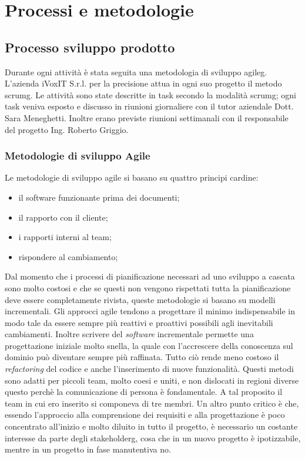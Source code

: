 
\chapter{Processi e metodologie}
\label{cap:processi-metodologie}


\section{Processo sviluppo prodotto}
Durante ogni attività è stata seguita una metodologia di sviluppo \gls{agileg}. L'azienda iVoxIT S.r.l. per la precisione attua in ogni suo progetto il metodo \gls{scrumg}. Le attività sono state descritte in task secondo la modalità \gls{scrumg}; ogni task veniva esposto e discusso in riunioni giornaliere con il tutor aziendale Dott. Sara Meneghetti. Inoltre erano previste riunioni settimanali con il responsabile del progetto Ing. Roberto Griggio.

\subsection{Metodologie di sviluppo Agile}
Le metodologie di sviluppo agile si basano su quattro principi cardine:
\begin{itemize}
    \item il software funzionante prima dei documenti;
    \item il rapporto con il cliente;
    \item i rapporti interni al team;
    \item rispondere al cambiamento;
\end{itemize}

Dal momento che i processi di pianificazione necessari ad uno sviluppo a cascata sono molto costosi e che se questi non vengono rispettati tutta la pianificazione deve essere completamente rivista, queste metodologie si basano su modelli incrementali. Gli approcci agile tendono a progettare il minimo indispensabile in modo tale da essere sempre più reattivi e proattivi possibili agli inevitabili cambiamenti. Inoltre scrivere del \textit{software} incrementale permette una progettazione iniziale molto snella, la quale con l’accrescere della conoscenza sul dominio può diventare sempre più raffinata. Tutto ciò rende meno costoso il \textit{refactoring} del codice e anche l’inserimento di nuove funzionalità. 
Questi metodi sono adatti per piccoli team, molto coesi e uniti, e non dislocati in regioni diverse questo perchè la comunicazione di persona è fondamentale. A tal proposito il team in cui ero inserito si componeva di tre membri.
Un altro punto critico è che, essendo l’approccio alla comprensione dei requisiti e alla progettazione è poco concentrato all’inizio e molto diluito in tutto il progetto, è necessario un costante interesse da parte degli \gls{stakeholderg}, cosa che in un nuovo progetto è ipotizzabile, mentre in un progetto in fase manutentiva no.
